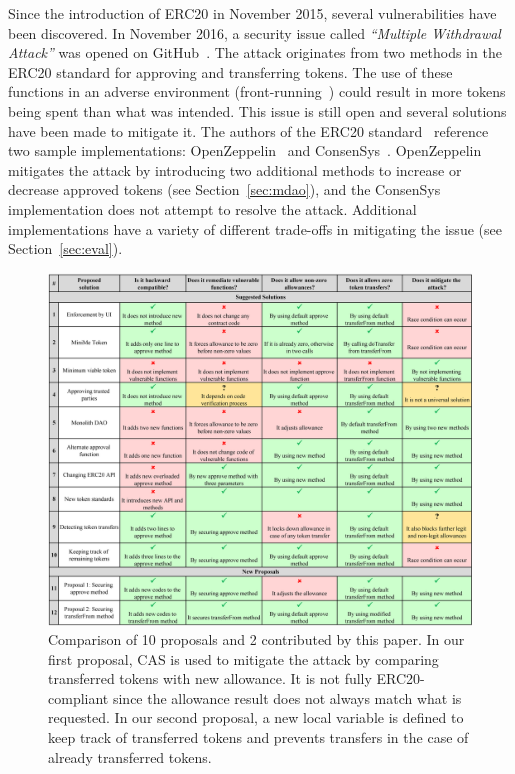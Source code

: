 Since the introduction of ERC20 in November 2015, several vulnerabilities have been discovered. In November 2016, a security issue called \textit{``Multiple Withdrawal Attack''} was opened on GitHub~\cite{Ref13,Ref07}. The attack originates from two methods in the ERC20 standard for approving and transferring tokens. The use of these functions in an adverse environment (\eg front-running~\cite{eskandari2019sok}) could result in more tokens being spent than what was intended. This issue is still open and several solutions have been made to mitigate it. The authors of the ERC20 standard~\cite{Ref08} reference two sample implementations: OpenZeppelin~\cite{Ref10} and ConsenSys~\cite{Ref11}. OpenZeppelin mitigates the attack by introducing two additional methods to increase or decrease approved tokens (see Section~\ref{sec:mdao}), and the ConsenSys implementation does not attempt to resolve the attack. Additional implementations have a variety of different trade-offs in mitigating the issue (see Section~\ref{sec:eval}).

\begin{figure}[t]
\includegraphics[width=\textwidth]{figures/multiple_withdrawal_04_wide.png}
\caption{Comparison of 10 proposals and 2 contributed by this paper. In our first proposal, CAS is used to mitigate the attack by comparing transferred tokens with new allowance. It is not fully ERC20-compliant since the allowance result does not always match what is requested. In our second proposal, a new local variable is defined to keep track of transferred tokens and prevents transfers in the case of already transferred tokens.\label{tab:comp}}
\end{figure}


